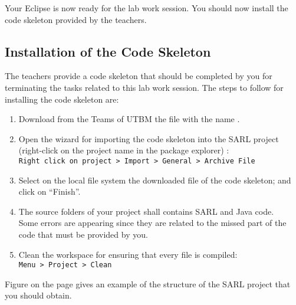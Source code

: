 Your Eclipse is now ready for the lab work session. You should now install the code skeleton provided by the teachers.

\subsection{Installation of the Code Skeleton}

The teachers provide a code skeleton that should be completed by you for terminating the tasks related to this lab work session.
The steps to follow for installing the code skeleton are:
\begin{enumerate}
\item Download from the Teams of UTBM the file with the name \skeletonName.
\item Open the wizard for importing the code skeleton into the SARL project (right-click on the project name in the package explorer)	: \\
	\texttt{Right click on project > Import > General > Archive File}
\item Select on the local file system the downloaded file of the code skeleton; and click on ``Finish''.
\item The source folders of your project shall contains SARL and Java code. \\
	Some errors are appearing since they are related to the missed part of the code that must be provided by you. 
\item Clean the workspace for ensuring that every file is compiled: \\
	\texttt{Menu > Project > Clean}
\end{enumerate}

Figure  on the page  gives an example of the structure of the SARL project that you should obtain.


